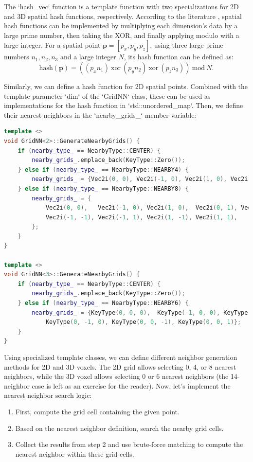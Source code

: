 The `hash_vec` function is a template function with two specializations for 2D and 3D spatial hash functions, respectively. According to the literature \cite{Teschner2003}, spatial hash functions can be implemented by multiplying each dimension's data by a large prime number, then taking the XOR, and finally applying modulo with a large integer. For a spatial point \(\bm{p}=[p_x, p_y, p_z]\), using three large prime numbers \(n_1, n_2, n_3\) and a large integer \(N\), its hash function can be defined as:
\begin{equation}\label{key}
	\text{hash}(\bm{p}) = ((p_x n_1) ~ \mathrm{xor}~ (p_y n_2) ~\mathrm{xor}~ (p_z n_3))~\text{mod}~ N.
\end{equation}

Similarly, we can define a hash function for 2D spatial points. Combined with the template parameter `dim` of the `GridNN` class, these can be used as implementations for the hash function in `std::unordered_map`. Then, we define their nearest neighbors in the `nearby_grids_` member variable:

\begin{lstlisting}[language=c++,caption=src/ch5/gridnn.hpp]
template <>
void GridNN<2>::GenerateNearbyGrids() {
	if (nearby_type_ == NearbyType::CENTER) {
		nearby_grids_.emplace_back(KeyType::Zero());
	} else if (nearby_type_ == NearbyType::NEARBY4) {
		nearby_grids_ = {Vec2i(0, 0), Vec2i(-1, 0), Vec2i(1, 0), Vec2i(0, 1), Vec2i(0, -1)};
	} else if (nearby_type_ == NearbyType::NEARBY8) {
		nearby_grids_ = {
			Vec2i(0, 0),   Vec2i(-1, 0), Vec2i(1, 0),  Vec2i(0, 1), Vec2i(0, -1),
			Vec2i(-1, -1), Vec2i(-1, 1), Vec2i(1, -1), Vec2i(1, 1),
		};
	}
}

template <>
void GridNN<3>::GenerateNearbyGrids() {
	if (nearby_type_ == NearbyType::CENTER) {
		nearby_grids_.emplace_back(KeyType::Zero());
	} else if (nearby_type_ == NearbyType::NEARBY6) {
		nearby_grids_ = {KeyType(0, 0, 0),  KeyType(-1, 0, 0), KeyType(1, 0, 0), KeyType(0, 1, 0),
			KeyType(0, -1, 0), KeyType(0, 0, -1), KeyType(0, 0, 1)};
	}
}
\end{lstlisting}

Using specialized template classes, we can define different neighbor generation methods for 2D and 3D voxels. The 2D grid allows selecting 0, 4, or 8 nearest neighbors, while the 3D voxel allows selecting 0 or 6 nearest neighbors (the 14-neighbor case is left as an exercise for the reader). Now, let's implement the nearest neighbor search logic:
\begin{enumerate}
	\item First, compute the grid cell containing the given point.
	\item Based on the nearest neighbor definition, search the nearby grid cells.
	\item Collect the results from step 2 and use brute-force matching to compute the nearest neighbor within these grid cells.
\end{enumerate}

